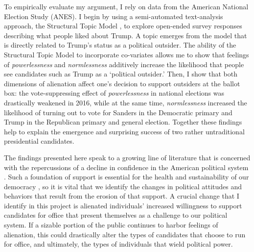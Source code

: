 \documentclass[12pt]{article}
\begin{document}
 To empirically evaluate my argument, I rely on data from the American National Election Study (ANES). I begin by using a semi-automated text-analysis approach, the Structural Topic Model \parencite{roberts2014structural}, to explore open-ended survey responses describing what people liked about Trump. A topic emerges from the model that is directly related to Trump's status as a political outsider. The ability of the Structural Topic Model to incorporate co-variates allows me to show that feelings of \textit{powerlessness} and \textit{normlessness} additively increase the likelihood that people see candidates such as Trump as a `political outsider.' Then, I show that both dimensions of alienation affect one's decision to support outsiders at the ballot box: the vote-suppressing effect of \textit{powerlessness} in national elections was drastically weakened in 2016, while at the same time, \textit{normlessness} increased the likelihood of turning out to vote for Sanders in the Democratic primary and Trump in the Republican primary and general election. Together these findings help to explain the emergence and surprising success of two rather untraditional presidential candidates. 

The findings presented here speak to a growing line of literature that is concerned with the repercussions of a decline in confidence in the American political system \parencite{Citrin2018,hetherington2015why}. Such a foundation of support is essential for the health and sustainability of our democracy \parencite{easton1965systems}, so it is vital that we identify the changes in political attitudes and behaviors that result from the erosion of that support. A crucial change that I identify in this project is alienated individuals' increased willingness to support candidates for office that present themselves as a challenge to our political system. If a sizable portion of the public continues to harbor feelings of alienation, this could drastically alter the types of candidates that choose to run for office, and ultimately, the types of individuals that wield political power. 







\end{document}
